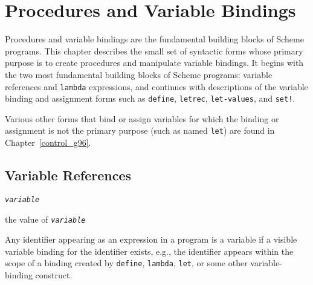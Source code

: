 \chapter{Procedures and Variable Bindings\label{binding_CHPTBINDING}}
\label{binding_g88}
\label{binding_h0}
\begin{figure}[H]
\centering
\setlength{\fboxrule}{3pt}
\end{figure}
\clearpage





\label{binding_s0}\label{binding_s1}Procedures and variable
bindings are the fundamental building blocks of Scheme programs.
This chapter describes the small set of syntactic forms whose
primary purpose is to create procedures and manipulate variable
bindings.
It begins with the two most fundamental building blocks of Scheme
programs: variable references and \texttt{lambda} expressions,
and continues with descriptions of
the variable binding and assignment forms such as \texttt{define},
\texttt{letrec}, \texttt{let-values}, and \texttt{set!}.


Various other forms that bind or assign variables for which the binding or
assignment is not the primary purpose (such as named \texttt{let}) are found
in Chapter \ref{control_g96}.


\section{\label{binding_g89}\label{binding_h1}Variable References\label{binding_SECTVARREF}}


\begin{description}

\label{binding_s2}\item[syntax] \texttt{\textit{variable}}



\item[returns] the value of \texttt{\textit{variable}}
\end{description}


Any identifier appearing as an expression in a program is a variable
if a visible variable binding for the identifier exists, e.g., the
identifier appears within the scope of a binding created by \texttt{define},
\texttt{lambda}, \texttt{let}, or some other variable-binding construct.


